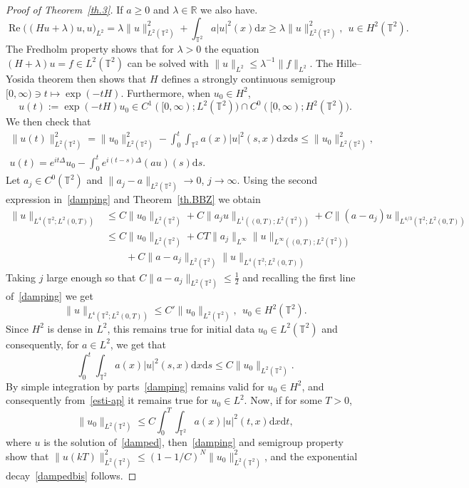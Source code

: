 \documentclass[10pt]{amsart}
\theoremstyle{definition}\newtheorem{defi}[theo]{Definition}\newtheorem{rema}[theo]{Remark}\newtheorem{exam}[theo]{Example}\newtheorem{exem}[theo]{Example}\newtheorem{nota}[theo]{Notation}
\DeclareMathOperator{\Reop}{Re}
\renewcommand{\Re}{\Reop}
\newcommand{\R}{{\mathbb R}}
\newcommand{\TT}{{\mathbb T}}
\newcommand*{\dd}{\mathrm{d}}
\newcommand*{\dx}{\dd x}
\newcommand*{\ds}{\dd s}
\newcommand*{\dt}{\dd t}
\begin{document}
\begin{proof}[Proof of Theorem~\ref{th.3}]
If $ a \geq 0 $ and $ \lambda \in \R $ we also have.
\[
\Re \bigl((Hu + \lambda) u, u \bigr)_{L^2} =
\lambda \| u \|_{L^2(\TT^2)} ^2 +
\int_{\TT^2} a |u|^2 (x) \dx \geq \lambda \| u \|_{L^2(\TT^2)} ^2, \ \ u \in H^2 (\TT^2).\ \
\]
The Fredholm property shows that for $\lambda >0$ the equation $(H + \lambda) u =f \in L^2(\TT^2)$ can be solved with $ \| u \|_{ L^2 } \leq \lambda^{-1} \| f \|_{L^2 } $. The Hille--Yosida theorem then shows that $ H $ defines a strongly continuous semigroup $ [0, \infty) \ni t \mapsto \exp (- t H) $. Furthermore, when $u_0 \in H^2$,
\[
u(t) := \exp (- t H) u_0 \in C^1([0, \infty) ; L^2(\TT^2))\cap C^0([0, \infty) ; H^2(\TT^2)).
\]
We then check that
\begin{equation}\label{damping}
\begin{gathered}
\| u(t) \|^2_{L^2(\TT^2)} = \| u_0 \|^2_{L^2(\TT^2)}- \int_0 ^t \int_{\TT^2} a(x) |u|^2(s,x) \dx \ds \leq \| u_0 \|^2_{L^2(\TT^2)},\\
u(t) = e^{it \Delta} u_0 - \int_0^t e^{i(t-s)\Delta} (au)(s) \ds.
\end{gathered}
\end{equation}
Let $a_j \in C^0 (\TT^2) $ and $ \| a_j - a\|_{L^2 (\TT^2) } \to 0 $, $ j \to \infty $. Using the second expression in~\eqref{damping} and Theorem~\ref{th.BBZ} we obtain
\[
\begin{split}
\| u\|_{L^4(\TT^2; L^2(0,T))} & \leq C \| u_0 \|_{L^2(\TT^2)} + C\| a_j u \|_{L^1((0,T); L^2(\TT^2))} + C\| (a- a_j)u \|_{L^{4/3}(\TT^2; L^2(0,T))}\\
& \leq C \| u_0 \|_{L^2(\TT^2)} +C T\| a_j\|_{L^\infty} \| u\|_{L^{\infty}((0,T); L^2(\TT^2))}
\\ & \qquad +C\| a-a_j\|_{L^2(\TT^2)} \| u \|_{L^{4}(\TT^2; L^2(0,T))}
\end{split}
\]
Taking $ j$ large enough so that $C\| a-a_j\|_{L^2(\TT^2)} \leq \frac12$ and recalling the first line of~\eqref{damping} we get
\[
\| u\|_{L^4(\TT^2; L^2(0,T))} \leq C' \| u_0 \|_{L^2(\TT^2)}, \ \
u_0 \in H^2 (\TT^2).
\]
Since $ H^2 $ is dense in $L ^2 $, this remains true for initial data $u_0\in L^2(\TT^2)$ and consequently, for $ a \in L^2 $, we get that
\begin{equation}\label{esti-ap}
\int_0 ^t \int_{\TT^2} a(x) |u|^2(s,x) \dx \ds\leq C \| u_0 \|_{L^2(\TT^2)}.
\end{equation}
By simple integration by parts~\eqref{damping} remains valid for $u_0\in H^2$, and consequently from~\eqref{esti-ap} it remains true for $u_0\in L^2$. Now, if for some $ T > 0 $,
\begin{equation}\label{eq:u00}
\| u_0 \|_{L^2(\TT^2)} \leq C \int_0 ^T \int_{\TT^2} a(x) |u|^2(t,x) \dx \dt,
\end{equation}
where $u$ is the solution of~\eqref{damped}, then~\eqref{damping} and semigroup property show that $ \| u (k T) \|_{ L^2 (\TT^2)}^2 \leq (1 - 1/C)^N \| u_0 \|_{ L^2 (\TT^2) }^2$, and the exponential decay~\eqref{dampedbis} follows.


\end{proof}
\end{document}
